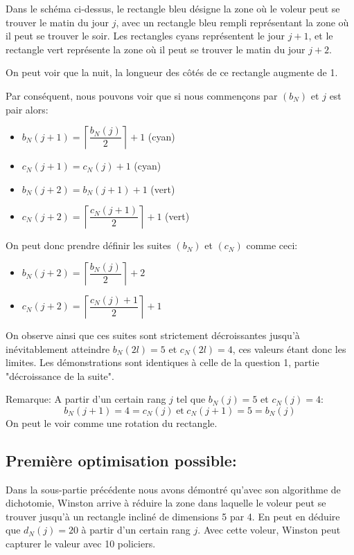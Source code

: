 Dans le schéma ci-dessus, le rectangle bleu désigne la zone où le voleur peut se trouver le matin du jour $j$, avec un rectangle bleu rempli représentant la zone où il peut se trouver le soir. Les rectangles cyans représentent le jour $j+1$, et le rectangle vert représente la zone où il peut se trouver le matin du jour $j+2$.

\medskip

On peut voir que la nuit, la longueur des côtés de ce rectangle augmente de 1.

Par conséquent, nous pouvons voir que si nous commençons par $(b_N)$ et $j$ est pair alors:
\begin{itemize}
    \item $b_N(j+1)=\left\lceil\dfrac{b_N(j)}{2}\right\rceil+1$ (cyan)
    \item $c_N(j+1)=c_N(j)+1$ (cyan)
\smallskip
    \item $b_N(j+2)=b_N(j+1)+1$ (vert)
    \item $c_N(j+2)=\left\lceil\dfrac{c_N(j+1)}{2}\right\rceil+1$ (vert)
\end{itemize}
On peut donc prendre définir les suites $(b_N)$ et $(c_N)$ comme ceci:
\begin{itemize}
    \item $b_N(j+2)=\left\lceil\dfrac{b_N(j)}{2}\right\rceil+2$
    \item $c_N(j+2)=\left\lceil\dfrac{c_N(j)+1}{2}\right\rceil+1$
\end{itemize}
On observe ainsi que ces suites sont strictement décroissantes jusqu'à inévitablement atteindre $b_N(2l)=5$ et $c_N(2l)=4$, ces valeurs étant donc les limites. Les démonstrations sont identiques à celle de la question 1, partie "décroissance de la suite".

Remarque: A partir d'un certain rang $j$ tel que $b_N(j)=5$ et $c_N(j)=4$: $$b_N(j+1)=4=c_N(j)\hspace{3pt} \text{et}\hspace{3pt} c_N(j+1)=5=b_N(j)$$
On peut le voir comme une rotation du rectangle.

\subsection{Première optimisation possible:}
Dans la sous-partie précédente nous avons démontré qu'avec son algorithme de dichotomie, Winston arrive à réduire la zone dans laquelle le voleur peut se trouver jusqu'à un rectangle incliné de dimensions 5 par 4. En peut en déduire que $d_N(j)=20$ à partir d'un certain rang $j$. Avec cette voleur, Winston peut capturer le valeur avec 10 policiers.

